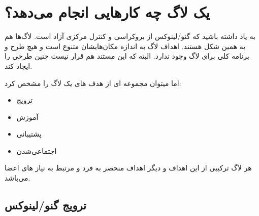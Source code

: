 \section{یک لاگ چه کارهایی انجام می‌دهد؟}

به یاد داشته باشید که گنو/لینوکس از بروکراسی و کنترل مرکزی آزاد است.
لاگ‌ها هم به همین شکل هستند. اهداف لاگ به اندازه مکان‌هایشان متنوع است
و هیچ طرح و برنامه کلی برای لاگ وجود ندارد. البته که این مستند هم
قرار نیست چنین طرحی را ایجاد کند.

اما میتوان مجموعه ای از هدف های یک لاگ را مشخص کرد:

\begin{itemize}
\item ترویج 
\item آموزش 
\item پشتیبانی 
\item اجتماعی‌شدن 
\end{itemize}

هر لاگ ترکیبی از این اهداف و دیگر اهداف منحصر به فرد و مرتبط
به نیاز های اعضا می‌باشد.

\subsection{ترویج گنو/لینوکس}


